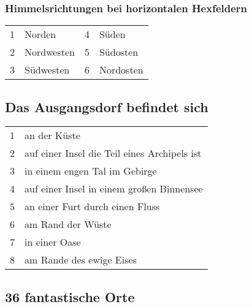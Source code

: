 \documentclass[11pt]{wbzine}
\begin{document}
\subsubsection{Himmelsrichtungen bei horizontalen Hexfeldern}
\begin{tabularx}{\columnwidth}{cZcZ}
1 & Norden & 4 & Süden\\
2 & Nordwesten & 5 & Südosten\\
3 & Südwesten & 6 & Nordosten\\
\end{tabularx}

\subsection{Das Ausgangsdorf befindet
sich}

\begin{tabularx}{\columnwidth}{cZ}
1 &  an der Küste \\
2 &  auf einer Insel die Teil eines Archipels ist \\
3 &  in einem engen Tal im Gebirge \\
4 &  auf einer Insel in einem großen Binnensee \\
5 &  an einer Furt durch einen Fluss \\
6 &  am Rand der Wüste \\
7 &  in einer Oase \\
8 &  am Rande des ewige Eises\\
\end{tabularx}

\subsection{36 fantastische Orte}
\end{document}

